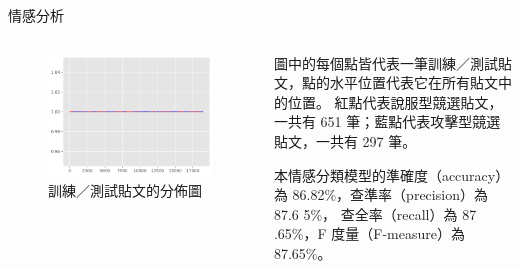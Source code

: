 \documentclass{beamer}
\begin{document}
\begin{CJK}{UTF8}{bkai}
\begin{frame}{情感分析}
\begin{columns}
\begin{column}{.55\textwidth}
  \begin{figure}
    \includegraphics[width=\textwidth, height=\textheight, keepaspectratio]{meta}
    \caption{訓練／測試貼文的分佈圖}
  \end{figure}
\end{column}
\begin{column}{.40\textwidth}
  \qquad 圖中的每個點皆代表一筆訓練／測試貼文，點的水平位置代表它在所有貼文中的位置。%
  紅點代表說服型競選貼文，一共有 651 筆；藍點代表攻擊型競選貼文，一共有 297 筆。\par
  \qquad 本情感分類模型的準確度（accuracy）為 86.82\%，查準率（precision）為 87.6 5\%，%
  查全率（recall）為 87 .65\%，F 度量（F-measure）為 87.65\%。%
\end{column}
\end{columns}
\end{frame}


\end{CJK}
\end{document}
